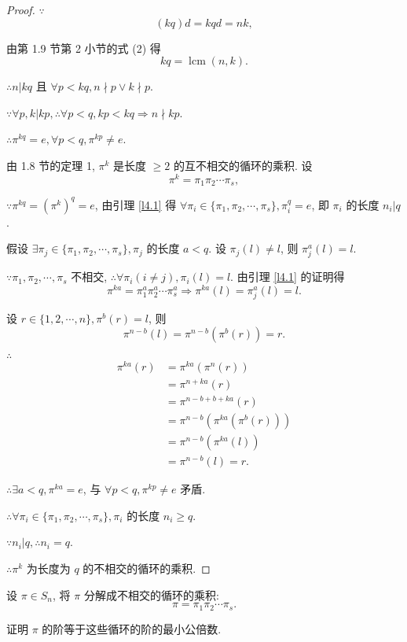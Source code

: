 \documentclass{ctexart}
\begin{document}
\begin{proof}
    $\because$
    \[(kq)d=kqd=nk,\]

    由第 1.9 节第 2 小节的式 (2) 得
    \[kq=\operatorname{lcm}(n,k).\]

    $\therefore n|kq$ 且 $\forall p<kq,n\nmid p\vee k\nmid p$.

    $\because\forall p,k|kp,\therefore\forall p<q,kp<kq\Rightarrow n\nmid kp$.
    
    $\therefore\pi^{kq}=e,\forall p<q,\pi^{kp}\neq e$.

    由 1.8 节的定理 1, $\pi^k$ 是长度 $\geq2$ 的互不相交的循环的乘积. 设
    \[\pi^k=\pi_1\pi_2\cdots\pi_s,\]

    $\because\pi^{kq}=(\pi^k)^q=e$, 由引理 \ref{l4.1} 得 $\forall\pi_i\in\{\pi_1,\pi_2,\cdots,\pi_s\},\pi_i^q=e$, 即 $\pi_i$ 的长度 $n_i|q$.

    假设 $\exists\pi_j\in\{\pi_1,\pi_2,\cdots,\pi_s\},\pi_j$ 的长度 $a<q$. 设 $\pi_j(l)\neq l$, 则 $\pi_j^a(l)=l$.

    $\because\pi_1,\pi_2,\cdots,\pi_s$ 不相交, $\therefore\forall\pi_i(i\neq j),\pi_i(l)=l$. 由引理 \ref{l4.1} 的证明得
    \[\pi^{ka}=\pi_1^a\pi_2^a\cdots\pi_s^a\Rightarrow\pi^{ka}(l)=\pi_j^a(l)=l.\]

    设 $r\in\{1,2,\cdots,n\},\pi^b(r)=l$, 则
    \[\pi^{n-b}(l)=\pi^{n-b}(\pi^b(r))=r.\]

    $\therefore$
    \begin{align*}
        \pi^{ka}(r) & =\pi^{ka}(\pi^{n}(r)) \\
        & =\pi^{n+ka}(r) \\
        & =\pi^{n-b+b+ka}(r) \\
        & =\pi^{n-b}(\pi^{ka}(\pi^b(r))) \\
        & =\pi^{n-b}(\pi^{ka}(l)) \\
        & =\pi^{n-b}(l)=r.
    \end{align*}

    $\therefore\exists a<q,\pi^{ka}=e$, 与 $\forall p<q,\pi^{kp}\neq e$ 矛盾.

    $\therefore\forall\pi_i\in\{\pi_1,\pi_2,\cdots,\pi_s\},\pi_i$ 的长度 $n_i\geq q$.

    $\because n_i|q,\therefore n_i=q$.

    $\therefore\pi^k$ 为长度为 $q$ 的不相交的循环的乘积.
\end{proof}
\begin{exercise}[2.13]
    设 $\pi\in S_n$, 将 $\pi$ 分解成不相交的循环的乘积:
    \[\pi=\pi_1\pi_2\cdots\pi_s.\]

    证明 $\pi$ 的阶等于这些循环的阶的最小公倍数.
\end{exercise}
\end{document}

